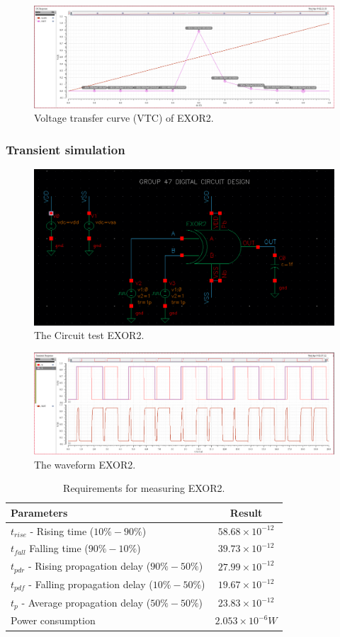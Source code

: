 \begin{figure}[H]
	\centering
	\includegraphics[width=.6\linewidth]{section/EX1/EXOR/EX1_EXOR2_DCanalysis_vtc.png}
	\caption{Voltage transfer curve (VTC) of EXOR2.}
	\label{f_EX1_EXOR2_DCanalysis_vtc}
\end{figure}

\subsubsection{Transient simulation}

\begin{figure}[H]
	\centering
	\includegraphics[width=.6\linewidth]{section/EX1/EXOR/EX1_EXOR2_Trans_schematic.png}
	\caption{The Circuit test EXOR2.}
\end{figure}

\begin{figure}[H]
	\centering
	\includegraphics[width=.6\linewidth]{section/EX1/EXOR/EX1_EXOR2_waveform.png}
	\caption{The waveform EXOR2.}
	\label{f_EX1_EXOR2_waveform}
\end{figure}

\begin{table}[H]
	\centering
	\begin{tabular}{|p{.5\linewidth}|c|}
		\hline
		Parameters & Result\\
		\hline
		$t_{rise}$ - Rising time ($10\% - 90\%$) & $58.68\times10^{-12}$\\
		\hline
		$t_{fall}$  Falling time ($90\% - 10\%$) & $39.73\times10^{-12}$\\
		\hline
		$t_{pdr}$ - Rising propagation delay ($90\% - 50\%$) & $27.99\times10^{-12}$\\
		\hline
		$t_{pdf}$ - Falling propagation delay ($10\% - 50\%$) & $19.67\times10^{-12}$\\
		\hline
		$t_{p}$ - Average propagation delay ($50\% - 50\%$) & $23.83\times10^{-12}$\\
		\hline
		Power consumption & $2.053\times10^{-6} W$\\
		\hline
	\end{tabular}
	\caption{Requirements for measuring EXOR2.}
	\label{f_measuring EXOR2}
\end{table}


